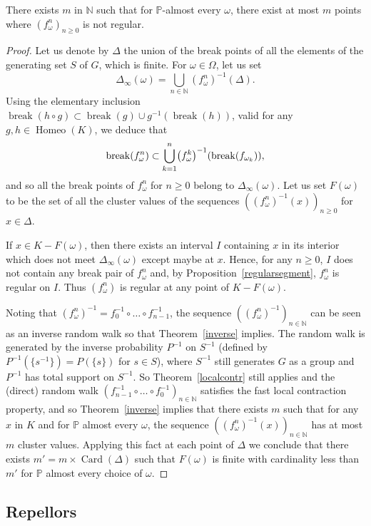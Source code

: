 \documentclass[AHL,Unicode,longabstracts,published]{cedram}
\DeclareMathOperator{\breaKk}{break}
\DeclareMathOperator{\Homeo}{Homeo}
\DeclareMathOperator{\Card}{Card}
\newcommand{\bbP}{\mathbb{P}}
\newcommand{\N}{\mathbb{N}}
\let\originalleft\left
\let\originalright\right
\renewcommand{\left}{\mathopen{}\mathclose\bgroup\originalleft}
\renewcommand{\right}{\aftergroup\egroup\originalright}
\begin{document}
\begin{lemm}\label{regular}
There exists $m$ in $\N$ such that for $\bbP$-almost every $\omega$, there exist at most $m$ points where $(f_\omega^n)_{n\geq 0}$ is not regular.
\end{lemm}
\begin{proof}
Let us denote by $\Delta$ the union of the break points of all the elements of the generating set $S$ of $G$, which is finite. For $\omega\in \Omega$, let us set
\[
\Delta_{\infty}(\omega)=\bigcup_{n\in\N} (f_\omega^n)^{-1}(\Delta).
\]
Using the elementary inclusion $\breaKk(h \circ g)\subset \breaKk(g)\cup g^{-1}(\breaKk(h))$, valid for any $g,h\in \Homeo(K)$, we deduce that
\[
\breaKk(f_\omega^n) \subset \bigcup_{k=1}^{n} \left(f_\omega^k\right)^{-1}(\breaKk(f_{\omega_k})),
\]
and so all the break points of $f_\omega^n$ for $n\geq 0$ belong to $\Delta_{\infty}(\omega)$. Let us set $F(\omega)$ to be the set of all the cluster values of the sequences $((f_{\omega}^{n})^{-1}(x))_{n \geq 0}$ for $x\in\Delta$.

If $x\in K-F(\omega)$, then there exists an interval $I$ containing $x$ in its interior which does not meet $\Delta_{\infty}(\omega)$ except maybe at $x$. Hence, for any $n\geq 0$, $I$ does not contain any break pair of $f_\omega^n$ and, by Proposition~\ref{regularsegment}, $f_\omega^n$ is regular on $I$. Thus $(f_\omega^n)$ is regular at any point of $K-F(\omega)$.

Noting that $(f_{\omega}^{n})^{-1}=f_0^{-1}\circ\dots\circ f_{n-1}^{-1}$, the sequence $((f_\omega^n)^{-1})_{n\in\N}$ can be seen as an inverse random walk so that Theorem~\ref{inverse} implies. The random walk is generated by the inverse probability $P^{-1}$ on $S^{-1}$ (defined by $P^{-1}(\{s^{-1}\})=P(\{s\})$ for $s\in S$), where $S^{-1}$ still generates $G$ as a group and $P^{-1}$ has total support on $S^{-1}$. So Theorem~\ref{localcontr} still applies and the (direct) random walk $(f_{n-1}^{-1}\circ\dots\circ f_{0}^{-1})_{n\in\N}$ satisfies the fast local contraction property, and so Theorem~\ref{inverse} implies that there exists $m$ such that for any $x$ in $K$ and for $\bbP$ almost every $\omega$, the sequence $((f_\omega^n)^{-1}(x))_{n\in\N}$ has at most $m$ cluster values. Applying this fact at each point of $\Delta$ we conclude that there exists $m'=m\times \Card(\Delta)$ such that $F(\omega)$ is finite with cardinality less than $m'$ for $\bbP$ almost every choice of $\omega$.
\end{proof}


\subsection{Repellors}
\end{document}
